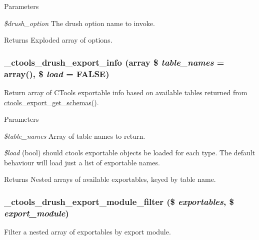 \begin{DoxyParams}{Parameters}
\item[{\em \$drush\_\-option}]The drush option name to invoke.\end{DoxyParams}
\begin{DoxyReturn}{Returns}
Exploded array of options. 
\end{DoxyReturn}
\hypertarget{ctools_8drush_8inc_aac7483ee1798cd2ff0d56f0237258dde}{
\subsubsection[{\_\-ctools\_\-drush\_\-export\_\-info}]{\setlength{\rightskip}{0pt plus 5cm}\_\-ctools\_\-drush\_\-export\_\-info (array \$ {\em table\_\-names} = {\ttfamily array()}, \/  \$ {\em load} = {\ttfamily FALSE})}}
\label{ctools_8drush_8inc_aac7483ee1798cd2ff0d56f0237258dde}
Return array of CTools exportable info based on available tables returned from \hyperlink{export_8inc_aa06e4d6e162ada14df00a3e420bcd0c1}{ctools\_\-export\_\-get\_\-schemas()}.


\begin{DoxyParams}{Parameters}
\item[{\em \$table\_\-names}]Array of table names to return. \item[{\em \$load}](bool) should ctools exportable objects be loaded for each type. The default behaviour will load just a list of exportable names.\end{DoxyParams}
\begin{DoxyReturn}{Returns}
Nested arrays of available exportables, keyed by table name. 
\end{DoxyReturn}
\hypertarget{ctools_8drush_8inc_a354ecd84880e806e6e1851db41918e8b}{
\subsubsection[{\_\-ctools\_\-drush\_\-export\_\-module\_\-filter}]{\setlength{\rightskip}{0pt plus 5cm}\_\-ctools\_\-drush\_\-export\_\-module\_\-filter (\$ {\em exportables}, \/  \$ {\em export\_\-module})}}
\label{ctools_8drush_8inc_a354ecd84880e806e6e1851db41918e8b}
Filter a nested array of exportables by export module.


